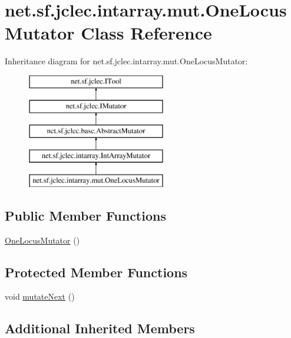 \hypertarget{classnet_1_1sf_1_1jclec_1_1intarray_1_1mut_1_1_one_locus_mutator}{\section{net.\-sf.\-jclec.\-intarray.\-mut.\-One\-Locus\-Mutator Class Reference}
\label{classnet_1_1sf_1_1jclec_1_1intarray_1_1mut_1_1_one_locus_mutator}
}
Inheritance diagram for net.\-sf.\-jclec.\-intarray.\-mut.\-One\-Locus\-Mutator\-:\begin{figure}[H]
\begin{center}
\leavevmode
\includegraphics[height=5.000000cm]{classnet_1_1sf_1_1jclec_1_1intarray_1_1mut_1_1_one_locus_mutator}
\end{center}
\end{figure}
\subsection*{Public Member Functions}
\begin{DoxyCompactItemize}
\item 
\hyperlink{classnet_1_1sf_1_1jclec_1_1intarray_1_1mut_1_1_one_locus_mutator_a3ad86d9929ee15928b0a1069d23253d1}{One\-Locus\-Mutator} ()
\end{DoxyCompactItemize}
\subsection*{Protected Member Functions}
\begin{DoxyCompactItemize}
\item 
void \hyperlink{classnet_1_1sf_1_1jclec_1_1intarray_1_1mut_1_1_one_locus_mutator_ad4a1be2de8902dc1153d7f0ed57132f7}{mutate\-Next} ()
\end{DoxyCompactItemize}
\subsection*{Additional Inherited Members}


